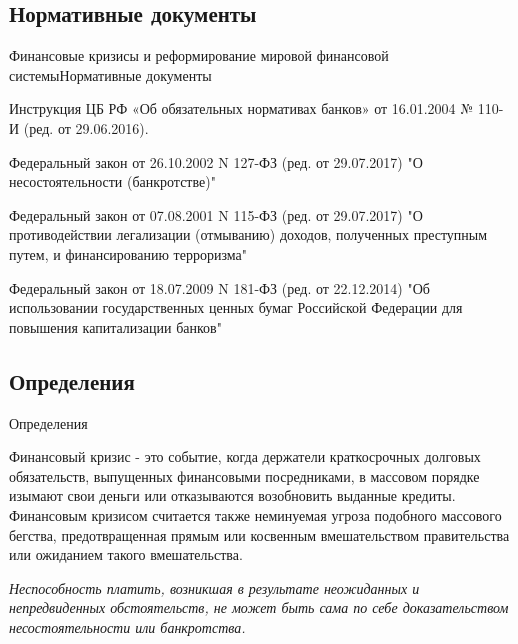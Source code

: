 \documentclass[_Banking_p1.tex]{subfiles}
\begin{document}

\subsection{Нормативные документы}
\begin{frame}[allowframebreaks]{\setfontsize{16pt} Финансовые кризисы и реформирование мировой финансовой системы}{Нормативные документы}
  \begin{thebibliography}{10}
  
  \beamertemplatearticlebibitems

Инструкция ЦБ РФ «Об обязательных нормативах банков» от 16.01.2004 № 110-И (ред. от 29.06.2016).

Федеральный закон от 26.10.2002 N 127-ФЗ (ред. от 29.07.2017) "О несостоятельности (банкротстве)"

\pagebreak

Федеральный закон от 07.08.2001 N 115-ФЗ (ред. от 29.07.2017) "О противодействии легализации (отмыванию) доходов, полученных преступным путем, и финансированию терроризма"

Федеральный закон от 18.07.2009 N 181-ФЗ (ред. от 22.12.2014) "Об использовании государственных ценных бумаг Российской Федерации для повышения капитализации банков"

  \end{thebibliography}

\end{frame}

\subsection{Определения}
\begin{frame} [ allowframebreaks]{Определения}
\begin{block}{Финансовый кризис }
\quad
- это событие, когда держатели краткосрочных долговых обязательств, выпущенных финансовыми посредниками, в массовом порядке изымают свои деньги или отказываются возобновить выданные кредиты. Финансовым кризисом считается также неминуемая угроза подобного массового бегства, предотвращенная прямым или косвенным вмешательством правительства или ожиданием такого вмешательства.
\end{block}
\pagebreak

\textit{Неспособность платить, возникшая в результате неожиданных и непредвиденных обстоятельств, не может быть сама по себе доказательством несостоятельности или банкротства.}

\end{frame}
\end{document}
